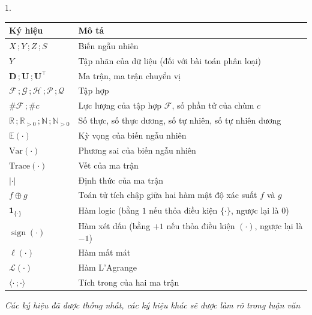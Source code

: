 \documentclass[a4paper,oneside]{book} %
\theoremstyle{plain}
\theoremstyle{plain}
\theoremstyle{nonumberplain}
\begin{document}
{\begin{spacing}{1.}
\begin{table}[h]
	\centering
	\begin{tabular*}{\columnwidth}{@{\extracolsep\fill}ll@{\extracolsep\fill}}
		\toprule
		\bf Ký hiệu                                                  & \bf Mô tả                                                   \\ \midrule
		$X\,;Y\,;Z\,;S$                                               & Biến ngẫu nhiên                                             \\
		$Y$                                                           & Tập nhãn của dữ liệu (đối với bài toán phân loại)           \\
		$ \bm D\,; \bm U\,; \bm U^\intercal $                         & Ma trận, ma trận chuyển vị                                  \\
		$ \mathcal{F}\,;\mathcal{G}\,; \mathcal{H}\,; \mathcal{P}\,;\mathcal{Q} $   & Tập hợp                                                     \\
		$\#\mathcal{F}\,;\#c$                                               & Lực lượng của tập hợp $\mathcal{F}$, số phần tử của chùm $c$                         \\
		$\mathbb{R}\,;\mathbb{R}_{>0}\,;\mathbb{N}\,;\mathbb{N}_{>0}$ & Số thực, số thực dương, số tự nhiên, số tự nhiên dương      \\
		$\mathbb{E}(\cdot)$                                           & Kỳ vọng của biến ngẫu nhiên                                 \\
		$\mathrm{Var}(\cdot)$                                         & Phương sai của biến ngẫu nhiên                              \\
		$\mathrm{Trace}(\cdot)$                                       & Vết của ma trận                                             \\
		$|\cdot|$                                                     & Định thức của ma trận                                       \\
		$f\oplus g$                                                         & Toán tử tích chập giữa hai hàm mật độ xác suất $f$ và $g$            \\
		$\bm1_{\{\cdot\}}$                                           & Hàm logic (bằng $1$ nếu thỏa điều kiện $\{\cdot\}$, ngược lại là $0$) \\
		$\operatorname{sign}(\cdot) $                                  & Hàm xét dấu  (bằng $+1$ nếu thỏa điều kiện $(\cdot)$, ngược lại là $-1$)                    \\
		$\ell(\cdot)$ & Hàm mất mát\\
		$\mathcal{L}(\cdot)$ & Hàm L'Agrange \\
		$\langle \cdot\,;\cdot\rangle$ & Tích trong của hai ma trận \\\bottomrule
	\end{tabular*}
	\begin{minipage}{\textwidth}
\fontsize{11pt}{14pt}\selectfont\it
		Các ký hiệu đã được thống nhất, các ký hiệu khác sẽ được làm rõ trong luận văn
	\end{minipage}
\end{table}



\end{spacing}}
\end{document}
